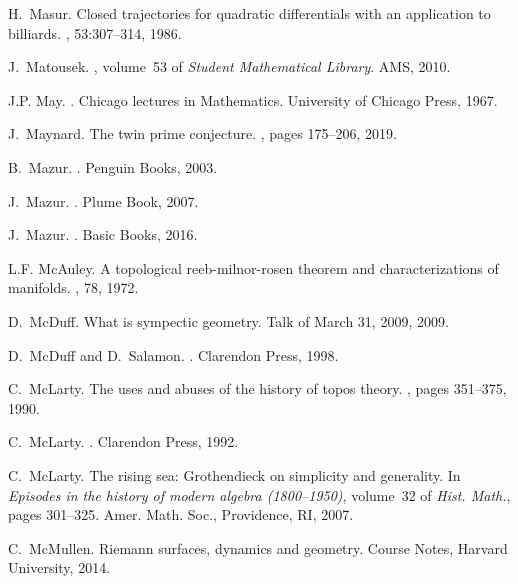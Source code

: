 \documentclass[12pt]{amsart}
\begin{document}
\begin{thebibliography}{100}
H.~Masur.
\newblock Closed trajectories for quadratic differentials with an application
  to billiards.
, 53:307--314, 1986.

J.~Matousek.
, volume~53 of {\em Student Mathematical
  Library}.
\newblock AMS, 2010.

J.P. May.
.
\newblock Chicago lectures in Mathematics. University of Chicago Press, 1967.

J.~Maynard.
\newblock The twin prime conjecture.
, pages 175--206, 2019.

B.~Mazur.
.
\newblock Penguin Books, 2003.

J.~Mazur.
.
\newblock Plume Book, 2007.

J.~Mazur.
.
\newblock Basic Books, 2016.

L.F. McAuley.
\newblock A topological reeb-milnor-rosen theorem and characterizations of
  manifolds.
, 78, 1972.

D.~McDuff.
\newblock What is sympectic geometry.
\newblock Talk of March 31, 2009, 2009.

D.~McDuff and D.~Salamon.
.
\newblock Clarendon Press, 1998.

C.~McLarty.
\newblock The uses and abuses of the history of topos theory.
, pages 351--375, 1990.

C.~McLarty.
.
\newblock Clarendon Press, 1992.

C.~McLarty.
\newblock The rising sea: {G}rothendieck on simplicity and generality.
\newblock In {\em Episodes in the history of modern algebra (1800--1950)},
  volume~32 of {\em Hist. Math.}, pages 301--325. Amer. Math. Soc., Providence,
  RI, 2007.

C.~McMullen.
\newblock Riemann surfaces, dynamics and geometry.
\newblock Course Notes, Harvard University, 2014.


\end{thebibliography}
\end{document}

